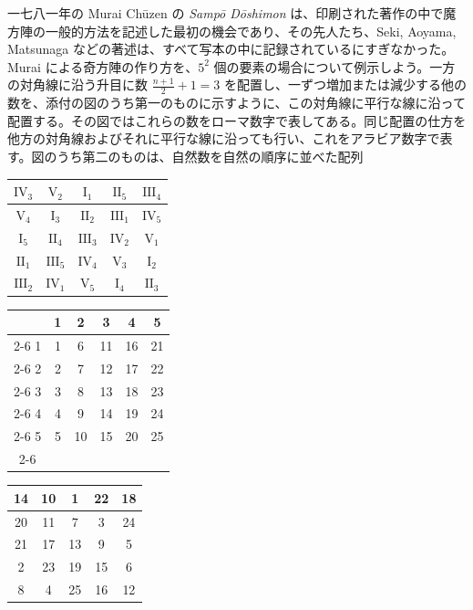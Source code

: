 \documentclass[11pt]{article}
\begin{document}
一七八一年の Murai Chūzen の \emph{Sampō Dōshimon} は、印刷された著作の中で魔方陣の一般的方法を記述した最初の機会であり、その先人たち、Seki, Aoyama, Matsunaga などの著述は、すべて写本の中に記録されているにすぎなかった。Murai による奇方陣の作り方を、$5^2$ 個の要素の場合について例示しよう。一方の対角線に沿う升目に数 $\frac{n+1}{2}+1=3$ を配置し、一ずつ増加または減少する他の数を、添付の図のうち第一のものに示すように、この対角線に平行な線に沿って配置する。その図ではこれらの数をローマ数字で表してある。同じ配置の仕方を他方の対角線およびそれに平行な線に沿っても行い、これをアラビア数字で表す。図のうち第二のものは、自然数を自然の順序に並べた配列
\begin{center}
\begin{tabular}[b]{|c|c|c|c|c|}
\hline
$\mathrm{IV}_3$ & $\mathrm{V}_2$ & $\mathrm{I}_1$ & $\mathrm{II}_5$ & $\mathrm{III}_4$\\ \hline
$\mathrm{V}_4$ & $\mathrm{I}_3$ & $\mathrm{II}_2$ & $\mathrm{III}_1$ & $\mathrm{IV}_5$\\ \hline
$\mathrm{I}_5$ & $\mathrm{II}_4$ & $\mathrm{III}_3$ & $\mathrm{IV}_2$ & $\mathrm{V}_1$\\ \hline
$\mathrm{II}_1$ & $\mathrm{III}_5$ & $\mathrm{IV}_4$ & $\mathrm{V}_3$ & $\mathrm{I}_2$\\ \hline
$\mathrm{III}_2$ & $\mathrm{IV}_1$ & $\mathrm{V}_5$ & $\mathrm{I}_4$ & $\mathrm{II}_3$\\ \hline
\end{tabular}\quad
\begin{tabular}[b]{c|c|c|c|c|c|}
\multicolumn{1}{c}{} & \multicolumn{1}{c}{1} & \multicolumn{1}{c}{2} & \multicolumn{1}{c}{3} & \multicolumn{1}{c}{4} & \multicolumn{1}{c}{5}\\ \cline{2-6}
1 & 1 & 6 & 11 & 16 & 21\\ \cline{2-6}
2 & 2 & 7 & 12 & 17 & 22\\ \cline{2-6}
3 & 3 & 8 & 13 & 18 & 23\\ \cline{2-6}
4 & 4 & 9 & 14 & 19 & 24\\ \cline{2-6}
5 & 5 & 10 & 15 & 20 & 25\\ \cline{2-6}
\end{tabular}\quad
\begin{tabular}[b]{|c|c|c|c|c|}
\hline
14 & 10 & 1 & 22 & 18\\ \hline
20 & 11 & 7 & 3 & 24\\ \hline
21 & 17 & 13 & 9 & 5\\ \hline
2 & 23 & 19 & 15 & 6\\ \hline
8 & 4 & 25 & 16 & 12\\ \hline
\end{tabular}
\end{center}
\end{document}
